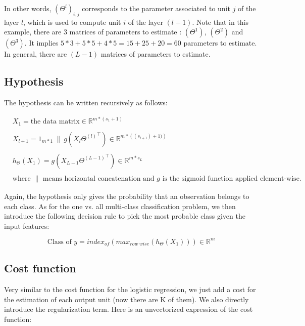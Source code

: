\documentclass[a4paper, 12pt]{article}
\begin{document}
In other words, ${\left(\Theta^{l}\right)}_{i, j}$ corresponds to the parameter associated to unit $j$ of the layer $l$, which is used to compute unit $i$ of the layer $(l+1)$. Note that in this example, there are 3 matrices of parameters to estimate : $\left(\Theta^{1}\right)$, $\left(\Theta^{2}\right)$ and $\left(\Theta^{3}\right)$. It implies $5*3 + 5*5 + 4*5 = 15 + 25 + 20 = 60$ parameters to estimate. In general, there are $(L-1)$ matrices of parameters to estimate. 

\subsection{Hypothesis}

The hypothesis can be written recursively as follows:

\begin{align*}
& X_1 = \text{the data matrix} \in \mathbb{R}^{m * (s_1+1)} \\
& \\
& X_{l+1} = 1_{m*1} \: \| \: g(X_{l}{\Theta^{(l)}}^{\top})  \in \mathbb{R}^{m * \left((s_{l+1})+1)\right)} \\
& \\
& h_{\Theta}(X_{1}) = g(X_{L-1}{\Theta^{(L-1)}}^{\top})  \in \mathbb{R}^{m * s_{L}} \\
& \\
& \text{where } \| \text{ means horizontal concatenation and } g \text{ is the sigmoid function applied element-wise}.
\end{align*}

Again, the hypothesis only gives the probability that an observation belongs to each class. As for the one vs. all multi-class classification problem, we then introduce the following decision rule to pick the most probable class given the input features:

\begin{equation}
\text{Class of } y = index_{of}\left( max_{row \: wise}(h_{\Theta}(X_{1})) \right) \in \mathbb{R}^{m}
\end{equation}

\subsection{Cost function}

Very similar to the cost function for the logistic regression, we just add a cost for the estimation of each output unit (now there are K of them). We also directly introduce the regularization term. Here is an unvectorized expression of the cost function:
\end{document}
